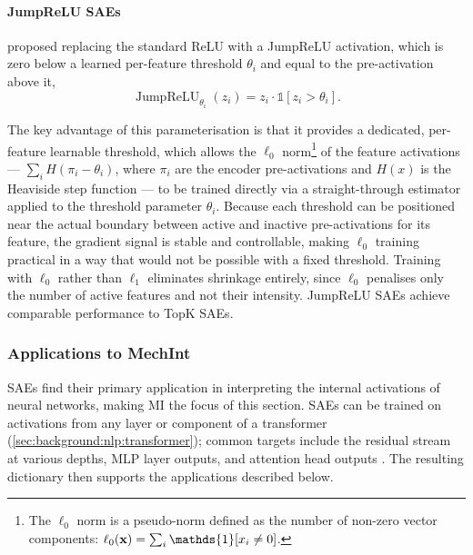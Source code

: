     \paragraph{JumpReLU SAEs} \citet{rajamanoharanJumpingAheadImproving2024}
    proposed replacing the standard ReLU with a JumpReLU activation, which is
    zero below a learned per-feature threshold $\theta_{i}$ and equal to the
    pre-activation above it,
    \begin{equation} \label{eq:background:ae:sae:jumprelu}
        \operatorname{JumpReLU}_{\theta_{i}}(z_{i}) = z_{i} \cdot
        \mathds{1}[z_{i} > \theta_{i}].
    \end{equation}

    The key advantage of this parameterisation is that it provides a dedicated,
    per-feature learnable threshold, which allows the $\ell_{0}$
    norm\footnote{The $\ell_{0}$ norm is a pseudo-norm defined as the number of
    non-zero vector components: $\ell_{0}(\vb{x}) = \sum_{i} \mathds{1}[x_{i}
    \neq 0]$.} of the feature activations --- $\sum_{i} H(\pi_{i} -
    \theta_{i})$, where $\pi_{i}$ are the encoder pre-activations and $H(x)$ is
    the Heaviside step function --- to be trained directly via a
    straight-through estimator applied to the threshold parameter $\theta_{i}$.
    Because each threshold can be positioned near the actual boundary between
    active and inactive pre-activations for its feature, the gradient signal is
    stable and controllable, making $\ell_{0}$ training practical in a way that
    would not be possible with a fixed threshold. Training with $\ell_{0}$
    rather than $\ell_{1}$ eliminates shrinkage entirely, since $\ell_{0}$
    penalises only the number of active features and not their intensity.
    JumpReLU \acp{SAE} achieve comparable performance to TopK \acp{SAE}.


\subsubsection{Applications to MechInt} \label{sec:background:ae:sae:applications}

\Acp{SAE} find their primary application in interpreting the internal
activations of neural networks, making \ac{MI} the focus of this section.
\Acp{SAE} can be trained on activations from any layer or component of a
transformer
(\cref{sec:background:nlp:transformer});
common targets include the residual stream at various depths, \ac{MLP} layer
outputs, and attention head outputs \cite{hubenSparseAutoencodersFind2023,
brickenMonosemanticityDecomposingLanguage2023}. The resulting dictionary then
supports the applications described below.

